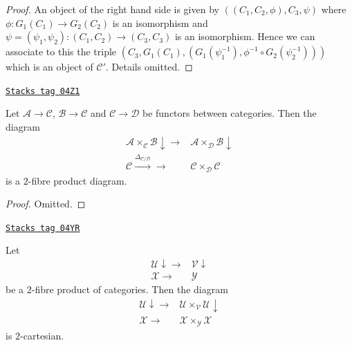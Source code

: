 \begin{proof}
An object of the right hand side is given by
$((C_1, C_2, \phi), C_3, \psi)$ where
$\phi : G_1(C_1) \to G_2(C_2)$ is an isomorphism
and $\psi = (\psi_1, \psi_2) : (C_1, C_2) \to (C_3, C_3)$ is
an isomorphism. Hence we can associate to this the triple
$(C_3, G_1(C_1), (G_1(\psi_1^{-1}), \phi^{-1} \circ G_2(\psi_2^{-1})))$
which is an object of $\mathcal{C}'$.
Details omitted.
\end{proof}

\begin{lemma}
\label{categories-lemma-fibre-product-after-map}
\href{https://stacks.math.columbia.edu/tag/04Z1}{\texttt{Stacks tag 04Z1}}

Let $\mathcal{A} \to \mathcal{C}$, $\mathcal{B} \to \mathcal{C}$
and $\mathcal{C} \to \mathcal{D}$ be functors between categories.
Then the diagram
$$
\begin{array}{cc}\mathcal{A} \times_\mathcal{C} \mathcal{B} \downarrow\longrightarrow & \mathcal{A} \times_\mathcal{D} \mathcal{B} \downarrow \\ \mathcal{C} \overset{\Delta_{\mathcal{C}/\mathcal{D}}}{\longrightarrow}\longrightarrow & \mathcal{C} \times_\mathcal{D} \mathcal{C}\end{array}
$$
is a $2$-fibre product diagram.
\end{lemma}

\begin{proof}
Omitted.
\end{proof}

\begin{lemma}
\label{categories-lemma-base-change-diagonal}
\href{https://stacks.math.columbia.edu/tag/04YR}{\texttt{Stacks tag 04YR}}

Let
$$
\begin{array}{cc}\mathcal{U} \downarrow\longrightarrow & \mathcal{V} \downarrow \\ \mathcal{X} \longrightarrow & \mathcal{Y}\end{array}
$$
be a $2$-fibre product of categories. Then the diagram
$$
\begin{array}{cc}\mathcal{U} \downarrow\longrightarrow & \mathcal{U} \times_\mathcal{V} \mathcal{U} \downarrow \\ \mathcal{X} \longrightarrow & \mathcal{X} \times_\mathcal{Y} \mathcal{X}\end{array}
$$
is $2$-cartesian.
\end{lemma}

